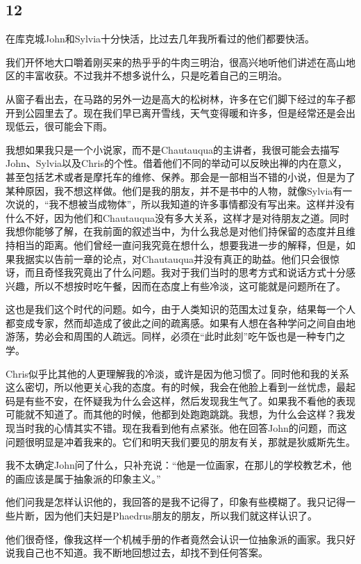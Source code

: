 \documentclass[UTF8]{article}
\begin{document}
\subsection*{12}
\par 在库克城John和Sylvia十分快活，比过去几年我所看过的他们都要快活。
\par 我们开怀地大口嚼着刚买来的热乎乎的牛肉三明治，很高兴地听他们讲述在高山地区的丰富收获。不过我并不想多说什么，只是吃着自己的三明治。
\par 从窗子看出去，在马路的另外一边是高大的松树林，许多在它们脚下经过的车子都开到公园里去了。现在我们早已离开雪线，天气变得暖和许多，但是经常还是会出现低云，很可能会下雨。
\par 我想如果我只是一个小说家，而不是Chautauqua的主讲者，我很可能会去描写John、Sylvia以及Chris的个性。借着他们不同的举动可以反映出禅的内在意义，甚至包括艺术或者是摩托车的维修、保养。那会是一部相当不错的小说，但是为了某种原因，我不想这样做。他们是我的朋友，并不是书中的人物，就像Sylvia有一次说的，“我不想被当成物体”，所以我知道的许多事情都没有写出来。这样并没有什么不好，因为他们和Chautauqua没有多大关系，这样才是对待朋友之道。同时我想你能够了解，在我前面的叙述当中，为什么我总是对他们持保留的态度并且维持相当的距离。他们曾经一直问我究竟在想什么，想要我进一步的解释，但是，如果我据实以告前一章的论点，对Chautauqua并没有真正的助益。他们只会很惊讶，而且奇怪我究竟出了什么问题。我对于我们当时的思考方式和说话方式十分感兴趣，所以不想按时吃午餐，因而在态度上有些冷淡，这可能就是问题所在了。
\par 这也是我们这个时代的问题。如今，由于人类知识的范围太过复杂，结果每一个人都变成专家，然而却造成了彼此之间的疏离感。如果有人想在各种学问之间自由地游荡，势必会和周围的人疏远。同样，必须在“此时此刻”吃午饭也是一种专门之学。
\par Chris似乎比其他的人更理解我的冷淡，或许是因为他习惯了。同时他和我的关系这么密切，所以他更关心我的态度。有的时候，我会在他脸上看到一丝忧虑，最起码是有些不安，在怀疑我为什么会这样，然后发现我生气了。如果我不看他的表现可能就不知道了。而其他的时候，他都到处跑跑跳跳。我想，为什么会这样？我发现当时我的心情其实不错。现在我看到他有点紧张。他在回答John的问题，而这问题很明显是冲着我来的。它们和明天我们要见的朋友有关，那就是狄威斯先生。
\par 我不太确定John问了什么，只补充说：“他是一位画家，在那儿的学校教艺术，他的画应该是属于抽象派的印象主义。”
\par 他们问我是怎样认识他的，我回答的是我不记得了，印象有些模糊了。我只记得一些片断，因为他们夫妇是Phaedrus朋友的朋友，所以我们就这样认识了。
\par 他们很奇怪，像我这样一个机械手册的作者竟然会认识一位抽象派的画家。我只好说我自己也不知道。我不断地回想过去，却找不到任何答案。
\end{document}
